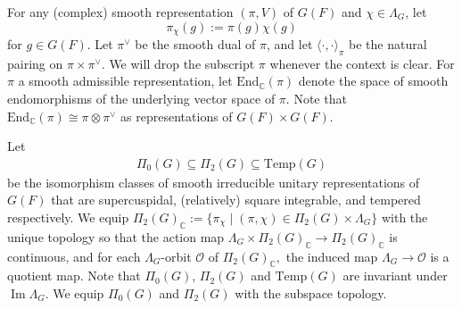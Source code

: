 \documentclass[10pt]{amsart}
\theoremstyle{definition}
\numberwithin{equation}{section}
\numberwithin{equation}{subsection}
\newcommand{\CC}{\mathbb{C}}
\newcommand{\Temp}{\mathrm{Temp}}
\renewcommand{\Im}{\mathop{\mathrm{Im}}}
\begin{document}
For any (complex) smooth representation $(\pi,V)$ of $G(F)$ and $\chi\in\Lambda_G$, let $$\pi_\chi(g) := \pi(g)\chi(g)$$ for $g\in G(F)$. Let $\pi^\lor$ be the smooth dual of $\pi$, and let $\langle \cdot ,\cdot \rangle_\pi$ be the natural pairing on $\pi\times \pi^\lor.$ We will drop the subscript $\pi$ whenever the context is clear. For $\pi$ a smooth admissible representation, let $\mathrm{End}_\CC(\pi)$ denote the space of smooth endomorphisms of the underlying vector space of $\pi$. Note that $\mathrm{End}_\CC(\pi)\cong \pi\otimes \pi^\vee$ as representations of $G(F)\times G(F)$.

Let
\begin{align*}
    \Pi_0(G)\subseteq \Pi_2(G)\subseteq \Temp(G)
\end{align*}
be the isomorphism classes of smooth irreducible unitary representations of $G(F)$ that are supercuspidal, (relatively) square integrable, and tempered respectively.  We equip $\Pi_2(G)_\CC := \{\pi_\chi\mid (\pi,\chi)\in\Pi_2(G)\times \Lambda_G\}$ with the unique topology so that the action map $\Lambda_G\times \Pi_2(G)_\CC\to \Pi_2(G)_\CC$ is continuous, and for each $\Lambda_G$-orbit $\mathcal{O}$ of  $\Pi_2(G)_\CC,$ the induced map $\Lambda_G\longrightarrow\mathcal{O}$ is a quotient map. Note that $\Pi_0(G)$, $\Pi_2(G)$ and $\Temp(G)$ are invariant under $\Im\Lambda_G$. We equip $\Pi_0(G)$ and $\Pi_2(G)$ with the subspace topology.
\end{document}
